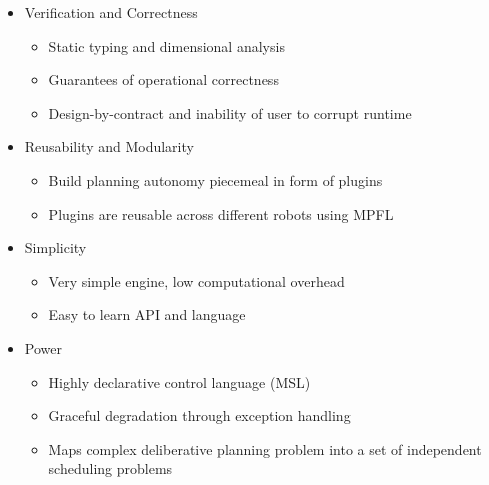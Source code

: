 \documentclass{beamer}
\begin{document}
\begin{frame}
	\begin{itemize}
	\item Verification and Correctness
		\begin{itemize}
		\item Static typing and dimensional analysis
		\item Guarantees of operational correctness
		\item Design-by-contract and inability of user to corrupt runtime
		\end{itemize}
	\item Reusability and Modularity
		\begin{itemize}
		\item Build planning autonomy piecemeal in form of plugins
		\item Plugins are reusable across different robots using MPFL
		\end{itemize}	
	\item Simplicity
		\begin{itemize}
		\item Very simple engine, low computational overhead
		\item Easy to learn API and language
		\end{itemize}
	\item Power
		\begin{itemize}
		\item Highly declarative control language (MSL)
		\item Graceful degradation through exception handling
		\item Maps complex deliberative planning problem into a set of independent scheduling problems
		\end{itemize}	
	\end{itemize}
\end{frame}
\end{document}
